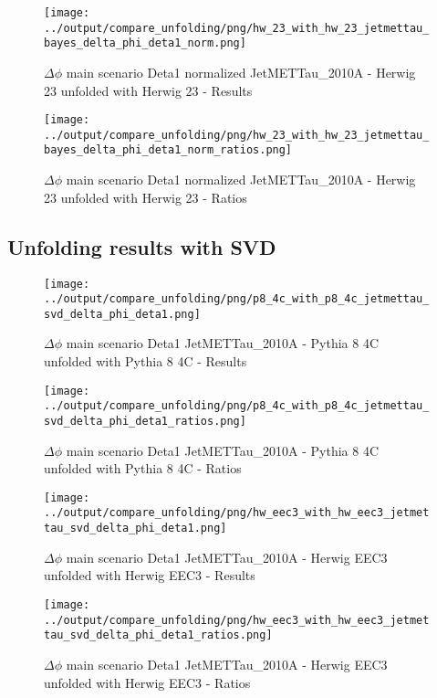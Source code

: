 \documentclass[11pt]{book}
\begin{document}
\begin{figure}[ht]
\centering
\texttt{[image: ../output/compare\_unfolding/png/hw\_23\_with\_hw\_23\_jetmettau\_bayes\_delta\_phi\_deta1\_norm.png]}
\caption{$\Delta\phi$ main scenario Deta1 normalized JetMETTau\_2010A - Herwig 23 unfolded with Herwig 23 - Results}
\label{hw_23_hw_23_jetmettau_bayes_delta_phi_deta1_norm_a}
\end{figure}

\begin{figure}[ht]
\centering
\texttt{[image: ../output/compare\_unfolding/png/hw\_23\_with\_hw\_23\_jetmettau\_bayes\_delta\_phi\_deta1\_norm\_ratios.png]}
\caption{$\Delta\phi$ main scenario Deta1 normalized JetMETTau\_2010A - Herwig 23 unfolded with Herwig 23 - Ratios}
\label{hw_23_hw_23_jetmettau_bayes_delta_phi_deta1_norm_b}
\end{figure}



\clearpage
\subsection{Unfolding results with SVD}
\begin{figure}[ht]
\centering
\texttt{[image: ../output/compare\_unfolding/png/p8\_4c\_with\_p8\_4c\_jetmettau\_svd\_delta\_phi\_deta1.png]}
\caption{$\Delta\phi$ main scenario Deta1 JetMETTau\_2010A - Pythia 8 4C unfolded with Pythia 8 4C - Results}
\label{p8_p8_jetmettau_svd_delta_phi_deta1_a}
\end{figure}

\begin{figure}[ht]
\centering
\texttt{[image: ../output/compare\_unfolding/png/p8\_4c\_with\_p8\_4c\_jetmettau\_svd\_delta\_phi\_deta1\_ratios.png]}
\caption{$\Delta\phi$ main scenario Deta1 JetMETTau\_2010A - Pythia 8 4C unfolded with Pythia 8 4C - Ratios}
\label{p8_p8_jetmettau_svd_delta_phi_deta1_b}
\end{figure}

\begin{figure}[ht]
\centering
\texttt{[image: ../output/compare\_unfolding/png/hw\_eec3\_with\_hw\_eec3\_jetmettau\_svd\_delta\_phi\_deta1.png]}
\caption{$\Delta\phi$ main scenario Deta1 JetMETTau\_2010A - Herwig EEC3 unfolded with Herwig EEC3 - Results}
\label{hw_eec3_hw_eec3_jetmettau_svd_delta_phi_deta1_a}
\end{figure}

\begin{figure}[ht]
\centering
\texttt{[image: ../output/compare\_unfolding/png/hw\_eec3\_with\_hw\_eec3\_jetmettau\_svd\_delta\_phi\_deta1\_ratios.png]}
\caption{$\Delta\phi$ main scenario Deta1 JetMETTau\_2010A - Herwig EEC3 unfolded with Herwig EEC3 - Ratios}
\label{hw_eec3_hw_eec3_jetmettau_svd_delta_phi_deta1_b}
\end{figure}
\end{document}
